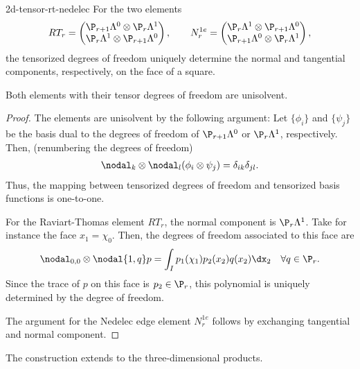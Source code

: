 \begin{Lemma}{2d-tensor-rt-nedelec}
  For the two elements
  \begin{gather}
    RT_r =
    \begin{pmatrix}
      \P_{r+1}\Lambda^0 \otimes \P_{r}\Lambda^1\\
      \P_{r}\Lambda^1 \otimes \P_{r+1}\Lambda^0
    \end{pmatrix},
    \qquad
    N^{1e}_r =
    \begin{pmatrix}
      \P_{r}\Lambda^1 \otimes \P_{r+1}\Lambda^0\\
      \P_{r+1}\Lambda^0 \otimes \P_{r}\Lambda^1      
    \end{pmatrix},
  \end{gather}
  the tensorized degrees of freedom uniquely determine the normal and
  tangential components, respectively, on the face of a square.

  Both elements with their tensor degrees of freedom are unisolvent.
\end{Lemma}

\begin{proof}
  The elements are unisolvent by the following argument: Let
  $\{\phi_i\}$ and $\{\psi_j\}$ be the basis dual to the degrees of
  freedom of $\P_{r+1}\Lambda^0$ or $\P_r \Lambda^1$,
  respectively. Then, (renumbering the degrees of freedom)
  \begin{gather}
    \nodal_k\otimes\nodal_l(\phi_i\otimes\psi_j) = \delta_{ik}\delta_{jl}.
  \end{gather}
  Thus, the mapping between tensorized degrees of freedom and
  tensorized basis functions is one-to-one.

  For the Raviart-Thomas element $RT_r$, the normal component is
  $\P_r\Lambda^1$. Take for instance the face $x_1 = \chi_0$. Then,
  the degrees of freedom associated to this face are
  \begin{gather}
    \nodal_{0,0} \otimes \nodal{1,q} p
    = \int_I p_1(\chi_1) p_2(x_2) q(x_2) \dx_2
    \quad\forall q\in \P_r.
  \end{gather}
  Since the trace of $p$ on this face is $p_2 \in \P_r$, this
  polynomial is uniquely determined by the degree of freedom.

  The argument for the Nedelec edge element $N^{1e}_r$ follows by
  exchanging tangential and normal component.
\end{proof}

\begin{remark}
  The construction extends to the three-dimensional products.
\end{remark}



